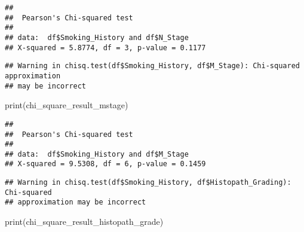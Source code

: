 \documentclass[
]{article}
\newenvironment{Shaded}{\begin{snugshade}}{\end{snugshade}}
\newcommand{\CommentTok}[1]{\textcolor[rgb]{0.56,0.35,0.01}{\textit{#1}}}
\newcommand{\FunctionTok}[1]{\textcolor[rgb]{0.00,0.00,0.00}{#1}}
\newcommand{\NormalTok}[1]{#1}
\newcommand{\OtherTok}[1]{\textcolor[rgb]{0.56,0.35,0.01}{#1}}
\newcommand{\SpecialCharTok}[1]{\textcolor[rgb]{0.00,0.00,0.00}{#1}}
\begin{document}
\begin{verbatim}
## 
##  Pearson's Chi-squared test
## 
## data:  df$Smoking_History and df$N_Stage
## X-squared = 5.8774, df = 3, p-value = 0.1177
\end{verbatim}

\begin{Shaded}
\end{Shaded}

\begin{verbatim}
## Warning in chisq.test(df$Smoking_History, df$M_Stage): Chi-squared approximation
## may be incorrect
\end{verbatim}

\begin{Shaded}
\begin{Highlighting}[]
\FunctionTok{print}\NormalTok{(chi\_square\_result\_mstage)}
\end{Highlighting}
\end{Shaded}

\begin{verbatim}
## 
##  Pearson's Chi-squared test
## 
## data:  df$Smoking_History and df$M_Stage
## X-squared = 9.5308, df = 6, p-value = 0.1459
\end{verbatim}

\begin{Shaded}
\end{Shaded}

\begin{verbatim}
## Warning in chisq.test(df$Smoking_History, df$Histopath_Grading): Chi-squared
## approximation may be incorrect
\end{verbatim}

\begin{Shaded}
\begin{Highlighting}[]
\FunctionTok{print}\NormalTok{(chi\_square\_result\_histopath\_grade)}
\end{Highlighting}
\end{Shaded}
\end{document}
